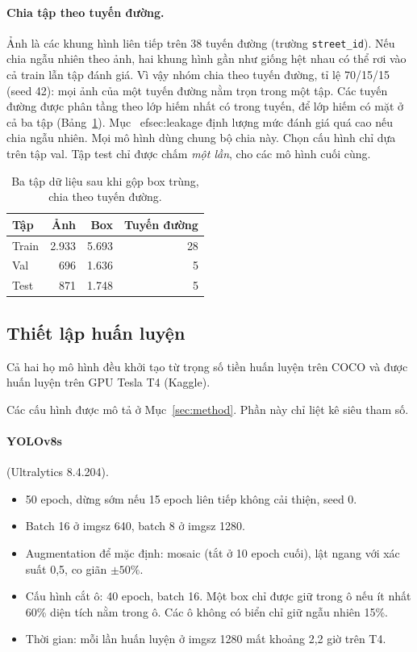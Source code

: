 \paragraph{Chia tập theo tuyến đường.}
Ảnh là các khung hình liên tiếp trên 38 tuyến đường (trường \texttt{street\_id}). Nếu chia ngẫu nhiên theo ảnh, hai khung hình gần như giống hệt nhau có thể rơi vào cả train lẫn tập đánh giá.
Vì vậy nhóm chia theo tuyến đường, tỉ lệ 70/15/15 (seed 42): mọi ảnh của một tuyến đường nằm trọn trong một tập. Các tuyến đường được phân tầng theo lớp hiếm nhất có trong tuyến, để lớp hiếm có mặt ở cả ba tập (Bảng~\ref{tab:split}).
Mục~
ef{sec:leakage} định lượng mức đánh giá quá cao nếu chia ngẫu nhiên.
Mọi mô hình dùng chung bộ chia này. Chọn cấu hình chỉ dựa trên tập val. Tập test chỉ được chấm \emph{một lần}, cho các mô hình cuối cùng.

\begin{table}[t]
\centering
\small
\begin{tabular}{lrrr}
\toprule
Tập & Ảnh & Box & Tuyến đường \\
\midrule
Train & 2.933 & 5.693 & 28 \\
Val   &   696 & 1.636 &  5 \\
Test  &   871 & 1.748 &  5 \\
\bottomrule
\end{tabular}
\caption{Ba tập dữ liệu sau khi gộp box trùng, chia theo tuyến đường.}
\label{tab:split}
\end{table}

\subsection{Thiết lập huấn luyện}
\label{sec:setup}

Cả hai họ mô hình đều khởi tạo từ trọng số tiền huấn luyện trên COCO \citep{lin2014coco} và được huấn luyện trên GPU Tesla T4 (Kaggle).

Các cấu hình được mô tả ở Mục~\ref{sec:method}. Phần này chỉ liệt kê siêu tham số.

\paragraph{YOLOv8s} (Ultralytics 8.4.204).
\begin{itemize}
\item 50 epoch, dừng sớm nếu 15 epoch liên tiếp không cải thiện, seed 0.
\item Batch 16 ở imgsz 640, batch 8 ở imgsz 1280.
\item Augmentation để mặc định: mosaic (tắt ở 10 epoch cuối), lật ngang với xác suất 0,5, co giãn $\pm 50\%$.
\item Cấu hình cắt ô: 40 epoch, batch 16. Một box chỉ được giữ trong ô nếu ít nhất 60\% diện tích nằm trong ô. Các ô không có biển chỉ giữ ngẫu nhiên 15\%.
\item Thời gian: mỗi lần huấn luyện ở imgsz 1280 mất khoảng 2,2 giờ trên T4.
\end{itemize}

